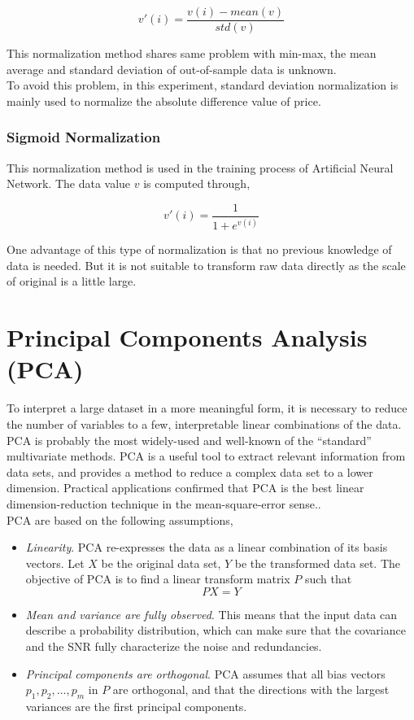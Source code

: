 \begin{equation}
v'(i)=\frac{v(i)-mean(v)}{std(v)}
\end{equation}

This normalization method shares same problem with min-max, the mean average and standard deviation of out-of-sample data is unknown.\\

To avoid this problem, in this experiment, standard deviation normalization is mainly used to normalize the absolute difference value of price.

\subsubsection{Sigmoid Normalization}
This normalization method is used in the training process of Artificial Neural Network. The data value $v$ is computed through\cite{nayak2014impact},

\begin{equation}
v'(i)=\frac{1}{1+e^{v(i)}}
\end{equation}

One advantage of this type of normalization is that no previous knowledge of data is needed. But it is not suitable to transform raw data directly as the scale of original is a little large.

\section{Principal Components Analysis (PCA)}
To interpret a large dataset in a more meaningful form, it is necessary to reduce the number of variables to a few, interpretable linear combinations of the data. PCA is probably the most widely-used and well-known of the “standard” multivariate methods. PCA is a useful tool to extract relevant information from data sets, and provides a method to reduce a complex data set to a lower dimension. Practical applications confirmed that PCA is the best linear dimension-reduction technique in the mean-square-error sense.\cite{4_kantardzic}.\\


PCA are based on the following assumptions\cite{shlens2014tutorial},
\begin{itemize}
	\item \emph{Linearity}. PCA re-expresses the data as a linear combination of its basis vectors. Let $ X $ be the original data set, $ Y $ be the transformed data set. The objective of PCA is to find a linear transform matrix $ P $ such that
	\begin{equation}
	PX=Y
	\end{equation}
	\item \emph{Mean and variance are fully observed}. This means that the input data can describe a probability distribution, which can make sure that the covariance and the SNR fully characterize the noise and redundancies.
	\item \emph{Principal components are orthogonal}. PCA assumes that all bias vectors $ {p_1, p_2, \ldots, p_m} $ in $ P $ are orthogonal, and that the directions with the largest variances are the first principal components.
\end{itemize}

